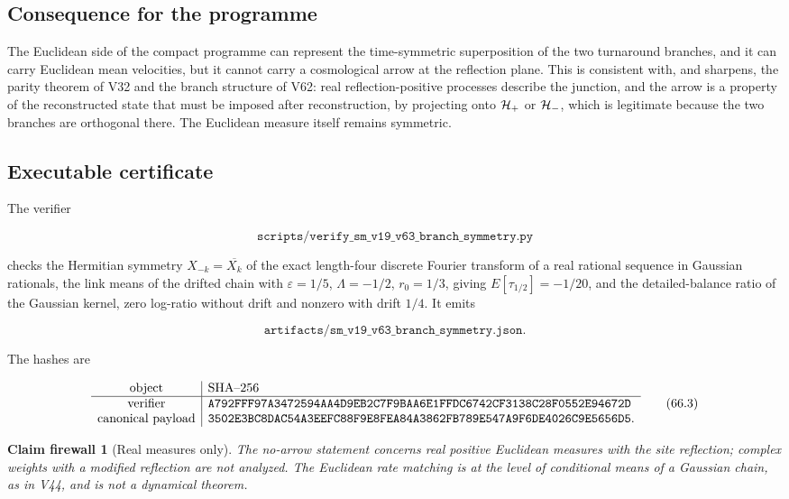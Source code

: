 \documentclass[11pt]{article}
\newtheorem{firewall}[theorem]{Claim firewall}
\theoremstyle{remark}
\begin{document}
\subsection{Consequence for the programme}

The Euclidean side of the compact programme can represent the
time-symmetric superposition of the two turnaround branches, and it can
carry Euclidean mean velocities, but it cannot carry a cosmological
arrow at the reflection plane.  This is consistent with, and sharpens,
the parity theorem of V32 and the branch structure of V62: real
reflection-positive processes describe the junction, and the arrow is
a property of the reconstructed state that must be imposed after
reconstruction, by projecting onto \({\cal H}_+\) or \({\cal H}_-\),
which is legitimate because the two branches are orthogonal there.
The Euclidean measure itself remains symmetric.

\subsection{Executable certificate}

The verifier

\[
 \texttt{scripts/verify\_sm\_v19\_v63\_branch\_symmetry.py}          \tag{66.1}
\]

checks the Hermitian symmetry \(X_{-k}=\overline{X_k}\) of the exact
length-four discrete Fourier transform of a real rational sequence in
Gaussian rationals, the link means of the drifted chain with
\(\varepsilon=1/5\), \(\Lambda=-1/2\), \(r_0=1/3\), giving
\(E[\tau_{1/2}]=-1/20\), and the detailed-balance ratio of the
Gaussian kernel, zero log-ratio without drift and nonzero with drift
\(1/4\).  It emits

\[
 \texttt{artifacts/sm\_v19\_v63\_branch\_symmetry.json}.             \tag{66.2}
\]

The hashes are

\[
\begin{array}{c|l}
\hbox{object}&\hbox{SHA--256}\\ \hline
\hbox{verifier}&
\texttt{A792FFF97A3472594AA4D9EB2C7F9BAA6E1FFDC6742CF3138C28F0552E94672D}\\
\hbox{canonical payload}&
\texttt{3502E3BC8DAC54A3EEFC88F9E8FEA84A3862FB789E547A9F6DE4026C9E5656D5}.
\end{array}                                                     \tag{66.3}
\]

\begin{firewall}[Real measures only]
\label{fire:v19v63}
The no-arrow statement concerns real positive Euclidean measures with
the site reflection; complex weights with a modified reflection are
not analyzed.  The Euclidean rate matching is at the level of
conditional means of a Gaussian chain, as in V44, and is not a
dynamical theorem.
\end{firewall}
\end{document}
